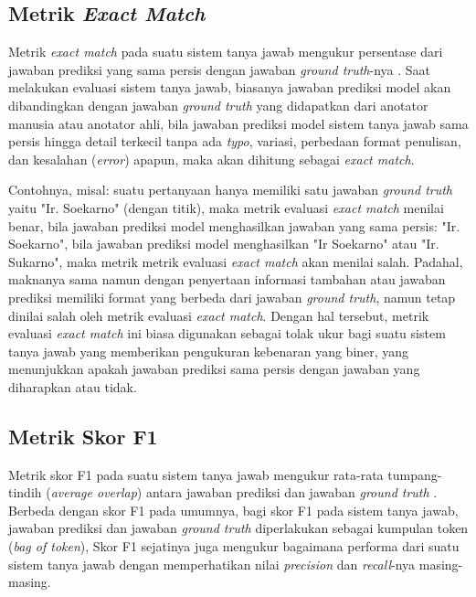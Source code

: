 \subsection{Metrik \emph{Exact Match}}
Metrik \emph{exact match} pada suatu sistem tanya jawab mengukur persentase dari jawaban prediksi yang sama persis dengan jawaban \emph{ground truth}-nya \citep{rajpurkar-etal-2016-squad}. Saat melakukan evaluasi sistem tanya jawab, biasanya jawaban prediksi model akan dibandingkan dengan jawaban \emph{ground truth} yang didapatkan dari anotator manusia atau anotator ahli, bila jawaban prediksi model sistem tanya jawab sama persis hingga detail terkecil tanpa ada \emph{typo}, variasi, perbedaan format penulisan, dan kesalahan (\emph{error}) apapun, maka akan dihitung sebagai \emph{exact match}.

Contohnya, misal: suatu pertanyaan hanya memiliki satu jawaban \emph{ground truth} yaitu "Ir. Soekarno" (dengan titik), maka metrik evaluasi \emph{exact match} menilai benar, bila jawaban prediksi model menghasilkan jawaban yang sama persis: "Ir. Soekarno", bila jawaban prediksi model menghasilkan "Ir Soekarno" atau "Ir. Sukarno", maka metrik metrik evaluasi \emph{exact match} akan menilai salah. Padahal, maknanya sama namun dengan penyertaan informasi tambahan atau jawaban prediksi memiliki format yang berbeda dari jawaban \emph{ground truth}, namun tetap dinilai salah oleh metrik evaluasi \emph{exact match}. Dengan hal tersebut, metrik evaluasi \emph{exact match} ini biasa digunakan sebagai tolak ukur bagi suatu sistem tanya jawab yang memberikan pengukuran kebenaran yang biner, yang menunjukkan apakah jawaban prediksi sama persis dengan jawaban yang diharapkan atau tidak.

\subsection{Metrik Skor F1}
Metrik skor F1  pada suatu sistem tanya jawab mengukur rata-rata tumpang-tindih (\emph{average overlap}) antara jawaban prediksi dan jawaban \emph{ground truth} \citep{rajpurkar-etal-2016-squad}. Berbeda dengan skor F1 pada umumnya, bagi \citeauthor{rajpurkar-etal-2016-squad} skor F1 pada sistem tanya jawab, jawaban prediksi dan jawaban \emph{ground truth} diperlakukan sebagai kumpulan token (\emph{bag of token}), Skor F1 sejatinya juga mengukur bagaimana performa dari suatu sistem tanya jawab dengan memperhatikan nilai \emph{precision} dan \emph{recall}-nya masing-masing. 


